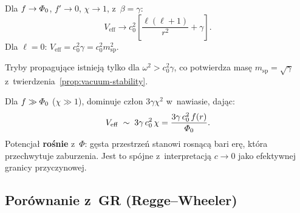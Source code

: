 \begin{corollary}\label{cor:weak-ringdown}
Dla $f \to \varPhi_0$, $f' \to 0$, $\chi \to 1$, z~$\beta = \gamma$:
\begin{equation}
  V_{\mathrm{eff}} \to c_0^2\left[
    \frac{\ell(\ell+1)}{r^2} + \gamma
  \right].
\end{equation}
Dla $\ell = 0$: $V_{\mathrm{eff}} = c_0^2\gamma = c_0^2 m_{\mathrm{sp}}^2$.

Tryby propaguj\k{a}ce istniej\k{a} tylko dla
$\omega^2 > c_0^2\gamma$, co potwierdza mas\k{e}
$m_{\mathrm{sp}} = \sqrt{\gamma}$ z~twierdzenia~\ref{prop:vacuum-stability}.
\end{corollary}

\begin{corollary}\label{cor:strong-ringdown}
Dla $f \gg \varPhi_0$ ($\chi \gg 1$), dominuje cz\l{}on
$3\gamma\chi^2$ w~nawiasie, daj\k{a}c:
\begin{equation}
  V_{\mathrm{eff}} \;\sim\; 3\gamma\,c_0^2\,\chi
  = \frac{3\gamma\,c_0^2\,f(r)}{\varPhi_0}.
\end{equation}
Potencja\l{} \textbf{ro\'snie} z~$\Phi$: g\k{e}sta przestrze\'n
stanowi rosn\k{a}c\k{a} bari er\k{e}, kt\'ora przechwytuje zaburzenia.
Jest to sp\'ojne z~interpretacj\k{a} $c \to 0$ jako
efektywnej granicy przyczynowej.
\end{corollary}

\subsection{Por\'ownanie z~GR (Regge--Wheeler)}

